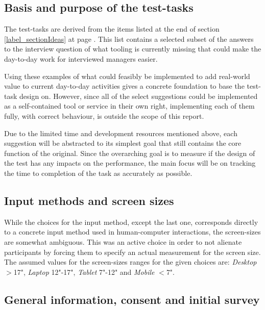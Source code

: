 {  \subsection{Basis and purpose of the test-tasks}

  The test-tasks are derived from the items listed at the
  end of section \ref{label_sectionIdeas} at page \pageref{label_ideas}.
  This list contains a selected subset of the answers to the
  interview question of what tooling is currently missing that could make
  the day-to-day work for interviewed managers easier.

  Using these examples of what could feasibly be implemented to add
  real-world value to current day-to-day activities gives a concrete
  foundation to base the test-task design on. However, since all of
  the select suggestions could be implemented as a self-contained tool or
  service in their own right, implementing each of them fully, with
  correct behaviour, is outside the scope of this report.

  Due to the limited time and development resources mentioned above, each
  suggestion will be abstracted to its simplest goal that still contains
  the core function of the original. Since the overarching goal is to
  measure if the design of the test has any impacts on the performance,
  the main focus will be on tracking the time to completion of the task
  as accurately as possible.

  \subsection{Input methods and screen sizes}

   While the choices for the input
  method, except the last one, corresponds directly to a concrete input
  method used in human-computer interactions, the screen-sizes are somewhat
  ambiguous. This was an active choice in order to not alienate
  participants by forcing them to specify an actual measurement for the
  screen size. The assumed values for the screen-sizes ranges for the given
  choices are:
  \textit{Desktop} $>$17",
  \textit{Laptop}  12"-17",
  \textit{Tablet}  7"-12" and
  \textit{Mobile}  $<$7".

  \subsection{General information, consent and initial survey}

}
